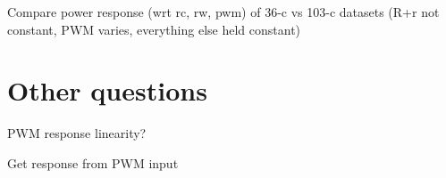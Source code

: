 \documentclass[11pt]{article}
\begin{document}
    Compare power response (wrt rc, rw, pwm) of 36-c vs 103-c datasets (R+r
not constant, PWM varies, everything else held constant)

    \section{Other questions}\label{other-questions}

PWM response linearity?

    Get response from PWM input


    
    
    
    
\end{document}

